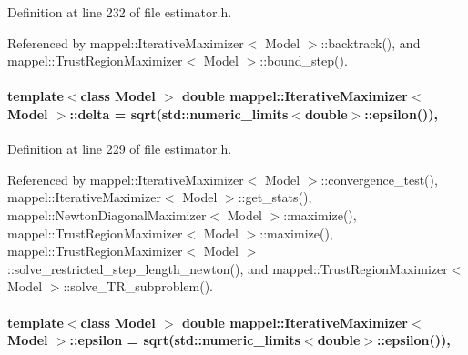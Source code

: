 Definition at line 232 of file estimator.\+h.



Referenced by mappel\+::\+Iterative\+Maximizer$<$ Model $>$\+::backtrack(), and mappel\+::\+Trust\+Region\+Maximizer$<$ Model $>$\+::bound\+\_\+step().

\paragraph[{\texorpdfstring{delta}{delta}}]{\setlength{\rightskip}{0pt plus 5cm}template$<$class Model $>$ double {\bf mappel\+::\+Iterative\+Maximizer}$<$ Model $>$\+::delta = sqrt(std\+::numeric\+\_\+limits$<$double$>$\+::{\bf epsilon}())\hspace{0.3cm}{\ttfamily [protected]}, {\ttfamily [inherited]}}\hypertarget{classmappel_1_1IterativeMaximizer_a0aab5231009711a55325adbeb7d5f282}{}\label{classmappel_1_1IterativeMaximizer_a0aab5231009711a55325adbeb7d5f282}


Definition at line 229 of file estimator.\+h.



Referenced by mappel\+::\+Iterative\+Maximizer$<$ Model $>$\+::convergence\+\_\+test(), mappel\+::\+Iterative\+Maximizer$<$ Model $>$\+::get\+\_\+stats(), mappel\+::\+Newton\+Diagonal\+Maximizer$<$ Model $>$\+::maximize(), mappel\+::\+Trust\+Region\+Maximizer$<$ Model $>$\+::maximize(), mappel\+::\+Trust\+Region\+Maximizer$<$ Model $>$\+::solve\+\_\+restricted\+\_\+step\+\_\+length\+\_\+newton(), and mappel\+::\+Trust\+Region\+Maximizer$<$ Model $>$\+::solve\+\_\+\+T\+R\+\_\+subproblem().

\paragraph[{\texorpdfstring{epsilon}{epsilon}}]{\setlength{\rightskip}{0pt plus 5cm}template$<$class Model $>$ double {\bf mappel\+::\+Iterative\+Maximizer}$<$ Model $>$\+::epsilon = sqrt(std\+::numeric\+\_\+limits$<$double$>$\+::epsilon())\hspace{0.3cm}{\ttfamily [protected]}, {\ttfamily [inherited]}}\hypertarget{classmappel_1_1IterativeMaximizer_ae727ea0e3cab3924d21ebe9c12fec314}{}\label{classmappel_1_1IterativeMaximizer_ae727ea0e3cab3924d21ebe9c12fec314}


